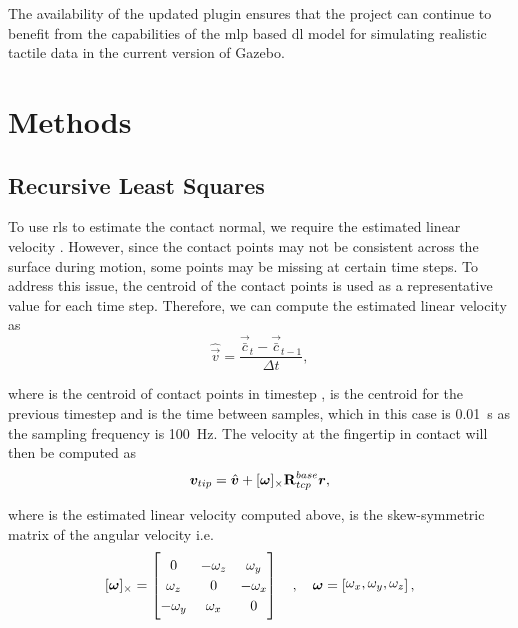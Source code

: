 The availability of the updated plugin ensures that the project can continue to benefit from the capabilities of the \gls{mlp} based \gls{dl} model for simulating realistic tactile data in the current version of Gazebo.


\section{Methods}\label{sec:1-tactile-perception-method}

\subsection{Recursive Least Squares} \label{sec:1-tactile-perception-recirsive-least-squares}

To use \gls{rls} to estimate the contact normal, we require the estimated linear velocity . However, since the contact points may not be consistent across the surface during motion, some points may be missing at certain time steps. To address this issue, the centroid of the contact points  is used as a representative value for each time step. Therefore, we can compute the estimated linear velocity as 
%
\begin{equation} \label{eq:v-estimate}
	\hat{\vec{v}} = \frac{\vec{\bar{c}}_{t} - \vec{\bar{c}}_{t-1}}{\Delta t},
\end{equation}

where  is the centroid of contact points in timestep ,  is the centroid for the previous timestep  and  is the time between samples, which in this case is \SI{0.01}{s} as the sampling frequency is \SI{100}{\hertz}. \medskip
The velocity at the fingertip in contact will then be computed as
%
\begin{equation} \label{eq:v-tip-def}
	\vec{v}_{tip} = \hat{\vec{v}} + [\bm{\omega}]_\times \rot[R]{base}{tcp} \vec{r},
\end{equation}

where  is the estimated linear velocity computed above, \mvar{[\bm{\omega}]_\times} is the skew-symmetric matrix of the angular velocity \mvar{\bm{\omega}} i.e.
%
\begin{equation} \label{eq:skew-symmetric-matrix}
	[\bm{\omega}]_\times = 
	\begin{bmatrix}
		0 & -\omega_z & \omega_y \\ \omega_z & 0 & -\omega_x \\ -\omega_y & \omega_x & 0
	\end{bmatrix} \quad , \quad \bm{\omega} = \rvec{\omega_x, \omega_y, \omega_z},
\end{equation}

